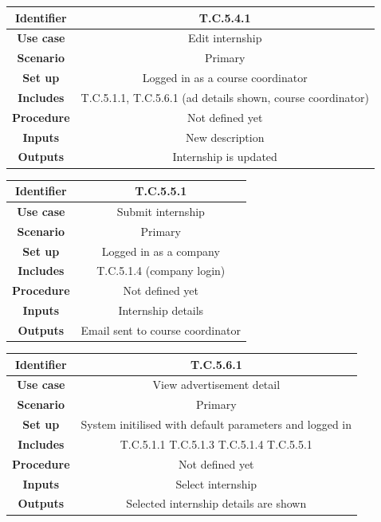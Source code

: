 \documentclass{l3deliverable}
\begin{document}
\begin{tabular}{|c|c|}
\hline \textbf{Identifier} & T.C.5.4.1 \\
\hline \textbf{Use case} & Edit internship\\
\hline \textbf{Scenario} & Primary\\
\hline \textbf{Set up} & Logged in as a course coordinator\\
\hline \textbf{Includes} & T.C.5.1.1, T.C.5.6.1 (ad details shown, course coordinator)\\
\hline \textbf{Procedure} & Not defined yet \\
\hline \textbf{Inputs} & New description\\
\hline \textbf{Outputs} & Internship is updated\\
\hline
\end{tabular}

\begin{tabular}{|c|c|}
\hline \textbf{Identifier} & T.C.5.5.1\\
\hline \textbf{Use case} & Submit internship\\
\hline \textbf{Scenario} & Primary\\
\hline \textbf{Set up} & Logged in as a company\\
\hline \textbf{Includes} & T.C.5.1.4 (company login)\\
\hline \textbf{Procedure} & Not defined yet\\
\hline \textbf{Inputs} & Internship details\\
\hline \textbf{Outputs} & Email sent to course coordinator\\
\hline
\end{tabular}

\begin{tabular}{|c|c|}
\hline \textbf{Identifier} & T.C.5.6.1\\
\hline \textbf{Use case} & View advertisement detail\\
\hline \textbf{Scenario} & Primary\\
\hline \textbf{Set up} & System initilised with default parameters and logged in\\
\hline \textbf{Includes} & T.C.5.1.1 T.C.5.1.3 T.C.5.1.4 T.C.5.5.1\\
\hline \textbf{Procedure} & Not defined yet\\
\hline \textbf{Inputs} & Select internship\\
\hline \textbf{Outputs} & Selected internship details are shown\\
\hline
\end{tabular}
\end{document}
